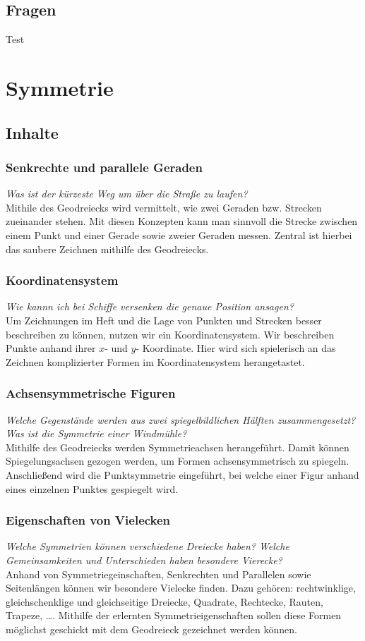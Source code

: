 \documentclass{article}
\begin{document}
\subsection{Fragen}
\begin{tcolorbox}[colback=blue!5!white,colframe=blue!25!black]
Test
\end{tcolorbox}
\newpage
\section{Symmetrie}
\subsection{Inhalte}
\subsubsection*{Senkrechte und parallele Geraden}
\textit{Was ist der kürzeste Weg um über die Straße zu laufen?}\\
Mithile des Geodreiecks wird vermittelt, wie zwei Geraden bzw. Strecken zueinander stehen. Mit diesen Konzepten kann man sinnvoll die Strecke zwischen einem Punkt und einer Gerade sowie zweier Geraden messen. Zentral ist hierbei das saubere Zeichnen mithilfe des Geodreiecks.
\subsubsection*{Koordinatensystem}
\textit{Wie kannn ich bei Schiffe versenken die genaue Position ansagen?}\\
Um Zeichnungen im Heft und die Lage von Punkten und Strecken besser beschreiben zu können, nutzen wir ein Koordinatensystem. Wir beschreiben Punkte anhand ihrer $x$- und $y$- Koordinate.
Hier wird sich  spielerisch an das Zeichnen komplizierter Formen im Koordinatensystem herangetastet.
\subsubsection*{Achsensymmetrische Figuren}
\textit{Welche Gegenstände werden aus zwei spiegelbildlichen Hälften zusammengesetzt? Was ist die Symmetrie einer Windmühle?}\\
Mithilfe des Geodreiecks werden Symmetrieachsen herangeführt. Damit können Spiegelungsachsen gezogen werden, um Formen achsensymmetrisch zu spiegeln. 
Anschließend wird die Punktsymmetrie eingeführt, bei welche einer Figur anhand eines einzelnen Punktes gespiegelt wird.
\subsubsection*{Eigenschaften von Vielecken}
\textit{Welche Symmetrien können verschiedene Dreiecke haben? Welche Gemeinsamkeiten und Unterschieden haben besondere Vierecke?}\\
Anhand von Symmetriegeinschaften, Senkrechten und Parallelen sowie Seitenlängen können wir besondere Vielecke finden. Dazu gehören: rechtwinklige, gleichschenklige und gleichseitige Dreiecke, Quadrate, Rechtecke, Rauten, Trapeze, \ldots. Mithilfe der erlernten Symmetrieigenschaften sollen diese Formen möglichst geschickt mit dem Geodreieck gezeichnet werden können.
\end{document}
